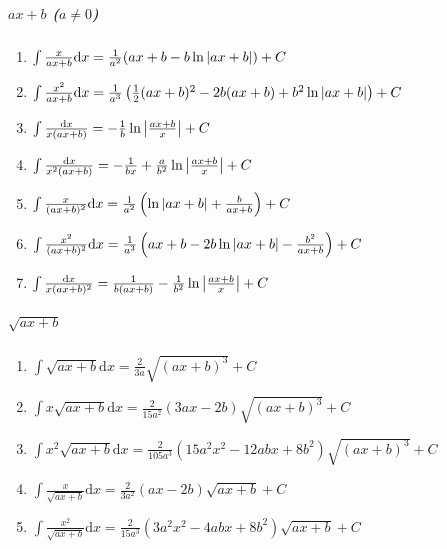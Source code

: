 \begin{tiny}

\subparagraph{$ax+b$ ($a\neq 0$)}
\begin{enumerate}

\item $ \int \frac{x}{ax+b} \mathrm{d} x = \frac{1}{a^2} (ax+b-b\ln|ax+b|) + C $

\item $ \int \frac{x^2}{ax+b} \mathrm{d} x = \frac{1}{a^3} \left( \frac{1}{2}(ax+b)^2-2b(ax+b)+b^2\ln|ax+b| \right) + C $

\item $ \int \frac{\mathrm{d} x}{x(ax+b)} = -\frac{1}{b}\ln \left| \frac{ax+b}{x} \right| + C $

\item $ \int \frac{\mathrm{d} x}{x^2(ax+b)} = -\frac{1}{bx} + \frac{a}{b^2}\ln\left| \frac{ax+b}{x} \right| + C $

\item $ \int \frac{x}{(ax+b)^2} \mathrm{d} x = \frac{1}{a^2}\left( \ln|ax+b|+\frac{b}{ax+b} \right) + C $

\item $ \int \frac{x^2}{(ax+b)^2}\mathrm{d} x = \frac{1}{a^3} \left( ax+b-2b\ln|ax+b|-\frac{b^2}{ax+b} \right) + C $

\item $ \int \frac{\mathrm{d} x}{x(ax+b)^2} = \frac{1}{b(ax+b)} - \frac{1}{b^2}\ln\left| \frac{ax+b}{x} \right| + C $

\end{enumerate}

\subparagraph{$\sqrt{ax+b}$}

\begin{enumerate}

\item $ \int \sqrt{ax+b} \mathrm{d}x = \frac{2}{3a} \sqrt{(ax+b)^3} + C $

\item $ \int x \sqrt{ax+b} \mathrm{d}x = \frac{2}{15a^2}(3ax-2b) \sqrt{(ax+b)^3} + C $

\item $ \int x^2 \sqrt{ax+b} \mathrm{d}x = \frac{2}{105a^3}(15a^2x^2-12abx+8b^2)\sqrt{(ax+b)^3} + C $

\item $ \int \frac{x}{\sqrt{ax+b}} \mathrm{d}x = \frac{2}{3a^2} (ax-2b) \sqrt{ax+b} + C $

\item $ \int \frac{x^2}{\sqrt{ax+b}} \mathrm{d} x = \frac{2}{15a^3} (3a^2x^2 - 4abx + 8b^2) \sqrt{ax+b} + C $


\end{enumerate}
\end{tiny}
